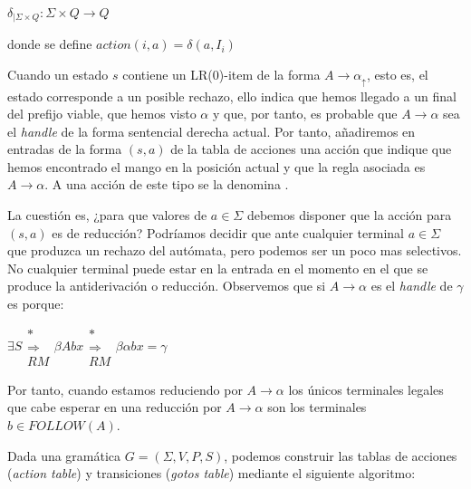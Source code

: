 \begin{center}
$\delta_{| \Sigma \times Q} :  \Sigma \times Q \rightarrow Q$

donde se define $action(i, a) = \delta(a,I_i)$
\end{center}


Cuando un estado $s$ contiene un LR(0)-item de la forma 
$A \rightarrow \alpha_\uparrow$, 
esto es, el estado corresponde a un posible rechazo,
ello indica que hemos llegado a un final del prefijo viable, que hemos
visto $\alpha$ y que, por tanto, es probable que $A \rightarrow \alpha$
sea el \emph{handle} de la forma sentencial derecha actual. Por tanto,
añadiremos en entradas de la forma $(s,a)$ de la tabla de acciones 
una acción que indique que hemos encontrado el mango en la 
posición actual y que la regla asociada es $A \rightarrow \alpha$.
A una acción de este tipo se la denomina .

La cuestión es, ¿para que valores de $a \in \Sigma$ debemos disponer que
la acción para $(s, a)$ es de reducción?
Podríamos decidir que ante cualquier terminal $a \in \Sigma$
que produzca un rechazo del autómata, pero podemos ser un poco mas
selectivos. No cualquier terminal puede estar en la entrada en el momento
en el que se produce la antiderivación o reducción. 
Observemos que si $A \rightarrow \alpha$ es el \emph{handle}
de $\gamma$ es porque:

\begin{center}
$\exists S \begin{array}{c} *\\ \Longrightarrow \\ {\scriptstyle RM} \end{array} \beta A b x \begin{array}{c} *\\ \Longrightarrow \\ {\scriptstyle RM} \end{array}  
\beta \alpha b x = \gamma$
\end{center}

Por tanto, cuando estamos reduciendo por $A \rightarrow \alpha$
los únicos terminales legales que cabe esperar en una reducción por $A \rightarrow \alpha$ son los terminales $b \in FOLLOW(A)$.


Dada una gramática $G=(\Sigma,V,P,S)$, podemos construir las tablas de acciones (\emph{action table}) y  transiciones (\emph{gotos table}) mediante el siguiente algoritmo:

